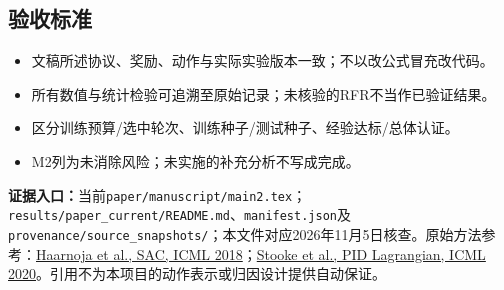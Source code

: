 \documentclass[UTF8,11pt,a4paper,fontset=fandol]{ctexart}
\newcommand{\code}[1]{\nolinkurl{#1}}
\begin{document}
\subsection*{验收标准}
\begin{itemize}
\item 文稿所述协议、奖励、动作与实际实验版本一致；不以改公式冒充改代码。
\item 所有数值与统计检验可追溯至原始记录；未核验的RFR不当作已验证结果。
\item 区分训练预算/选中轮次、训练种子/测试种子、经验达标/总体认证。
\item M2列为未消除风险；未实施的补充分析不写成完成。
\end{itemize}

{\small\textbf{证据入口：}当前\code{paper/manuscript/main2.tex}；\code{results/paper_current/README.md}、\code{manifest.json}及\code{provenance/source_snapshots/}；本文件对应2026年11月5日核查。原始方法参考：\href{https://proceedings.mlr.press/v80/haarnoja18b.html}{Haarnoja et al., SAC, ICML 2018}；\href{https://proceedings.mlr.press/v119/stooke20a.html}{Stooke et al., PID Lagrangian, ICML 2020}。引用不为本项目的动作表示或归因设计提供自动保证。}
\end{document}
